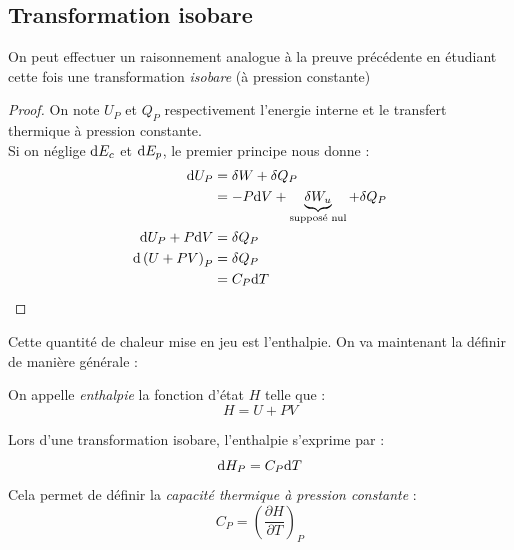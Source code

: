 \documentclass[11pt,a4paper,fleqn,pdftex]{report}
\begin{document}
\subsection{Transformation isobare} %
\label{sub:transformation_isobare}
On peut effectuer un raisonnement analogue à la preuve précédente en étudiant cette fois une transformation \emph{isobare} (à pression constante)
\begin{proof}\label{proof:therm_transformation_isobare}
   On note $U_P$ et $Q_P$ respectivement l'energie interne et le transfert thermique à pression constante.\\
   Si on néglige $\mathrm{d} E_c$ et $\mathrm{d} E_p$, le premier principe nous donne : 
   \begin{align*}
      \mathrm{d} U_P &= \delta W +\delta Q_P \\
           &= -P\mathrm{d} V + \underbrace{\delta W_u}_{\text{supposé nul}} + \delta Q_P \\
      \mathrm{d} U_P + P\mathrm{d} V &= \delta Q_P \\
      \mathrm{d} \left( U + PV \right)_P &= \delta Q_P \\
                                 &= C_P\mathrm{d} T
   \end{align*}
\end{proof}
Cette quantité de chaleur mise en jeu est l'enthalpie. On va maintenant la définir de manière générale : 
\begin{dfn}
On appelle \emph{enthalpie} la fonction d'état $H$ telle que : 
\begin{equation}\label{eq:enthalpie}
H = U + PV 
\end{equation}
\end{dfn}
\begin{theorem}
   Lors d'une transformation isobare, l'enthalpie s'exprime par : 
   \begin{equation}
   \mathrm{d} H_P = C_P\mathrm{d} T
   \end{equation}
   Cela permet de définir la \emph{capacité thermique à pression constante} : 
   \begin{equation}
   C_P = \left( \dfrac{\partial H}{\partial T} \right)_P
   \end{equation}
\end{theorem}
\end{document}
